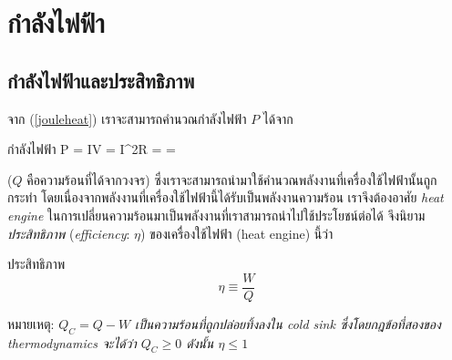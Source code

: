 \section{กำลังไฟฟ้า}

\subsection{กำลังไฟฟ้าและประสิทธิภาพ}

จาก (\ref{jouleheat}) เราจะสามารถคำนวณกำลังไฟฟ้า $P$ ได้จาก
\begin{ieqbox}{กำลังไฟฟ้า}
    P = IV = I^2R =  =  \label{power}
\end{ieqbox}
($Q$ คือความร้อนที่ได้จากวงจร) ซึ่งเราจะสามารถนำมาใช้คำนวณพลังงานที่เครื่องใช้ไฟฟ้านั้นถูกกระทำ โดยเนื่องจากพลังงานที่เครื่องใช้ไฟฟ้านี้ได้รับเป็นพลังงานความร้อน เราจึงต้องอาศัย \emph{heat engine} ในการเปลี่ยนความร้อนมาเป็นพลังงานที่เราสามารถนำไปใช้ประโยชน์ต่อได้ จึงนิยาม\emph{ประสิทธิภาพ} (\emph{efficiency}: $\eta$) ของเครื่องใช้ไฟฟ้า (heat engine) นี้ว่า
\begin{defbox}{ประสิทธิภาพ}
    \begin{equation}
        \eta \equiv \frac{W}{Q}
    \end{equation}
\end{defbox}
หมายเหตุ: \emph{$Q_C = Q - W$ เป็นความร้อนที่ถูกปล่อยทิ้งลงใน cold sink ซึ่งโดยกฎข้อที่สองของ thermodynamics จะได้ว่า $Q_C \geq 0$ ดังนั้น $\eta \leq 1$}
